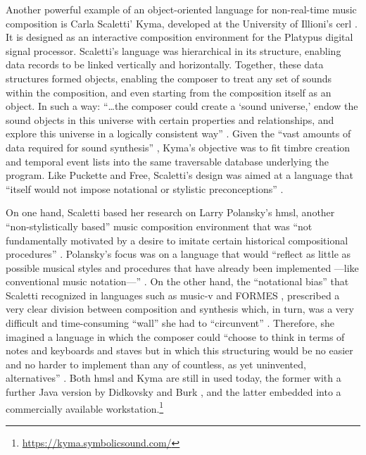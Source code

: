 	Another powerful example of an object-oriented language for non-real-time music composition is Carla Scaletti' Kyma, developed at the University of Illioni's \gls{cerl} \parencite{DBLP:conf/icmc/Scaletti87}. It is designed as an interactive composition environment for the Platypus digital signal processor. Scaletti's language was hierarchical in its structure, enabling data records to be linked vertically and horizontally. Together, these data structures formed objects, enabling the composer to treat any set of sounds within the composition, and even starting from the composition itself as an object. In such a way: ``\dots the composer could create a `sound universe,' endow the sound objects in this universe with certain properties and relationships, and explore this universe in a logically consistent way'' \parencite[50]{DBLP:conf/icmc/Scaletti87}. Given the ``vast amounts of data required for sound synthesis'' \parencite[50]{DBLP:conf/icmc/Scaletti87}, Kyma's objective was to fit timbre creation and temporal event lists into the same traversable database underlying the program. Like Puckette and Free, Scaletti's design was aimed at a language that ``itself would not impose notational or stylistic preconceptions'' \parencite[50]{DBLP:conf/icmc/Scaletti87}.

	On one hand, Scaletti based her research on Larry Polansky's \gls{hmsl}, another ``non-stylistically based'' music composition environment that was ``not fundamentally motivated by a desire to imitate certain historical compositional procedures'' \parencite[224]{DBLP:conf/icmc/RosenboomP85}. Polansky's focus was on a language that would ``reflect as little as possible musical styles and procedures that have already been implemented ---like conventional music notation---'' \parencite[224]{DBLP:conf/icmc/RosenboomP85}. On the other hand, the ``notational bias'' \parencite[49]{DBLP:conf/icmc/Scaletti87} that Scaletti recognized in languages such as \gls{music-v} and FORMES \parencites{DBLP:conf/icmc/RodetBCP82}{DBLP:conf/icmc/BoyntonDPR86}, prescribed a very clear division between composition and synthesis which, in turn, was a very difficult and time-consuming ``wall'' she had to ``circunvent'' \parencite[49]{DBLP:conf/icmc/Scaletti87}. Therefore, she imagined a language in which the composer could ``choose to think in terms of notes and keyboards and staves but in which this structuring would be no easier and no harder to implement than any of countless, as yet uninvented, alternatives'' \parencite[49]{DBLP:conf/icmc/Scaletti87}. Both \gls{hmsl} and Kyma are still in used today, the former with a further Java version by Didkovsky and Burk \parencite{DBLP:conf/icmc/DidkovskyB01}, and the latter embedded into a commercially available workstation.\footnote{\url{https://kyma.symbolicsound.com/}}

